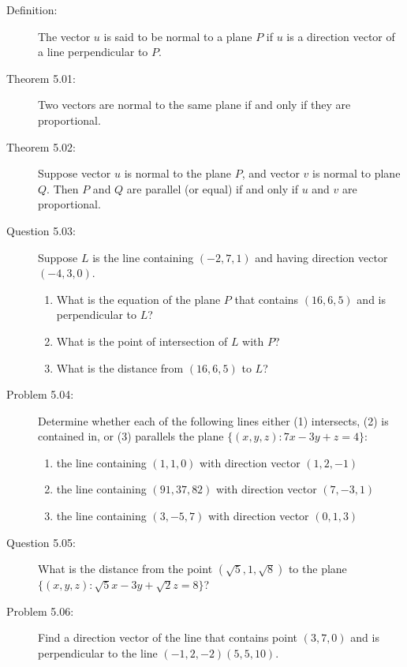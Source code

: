 \documentclass{article}
\begin{document}
\begin{description}

  \item[Definition:] The vector $u$ is said to be normal to a plane $P$ if $u$ is a direction vector of a line perpendicular to $P$.

  \item[Theorem 5.01:] Two vectors are normal to the same plane if and only if they are proportional.

  \item[Theorem 5.02:] Suppose vector $u$ is normal to the plane $P$, and vector $v$ is normal to plane $Q$. Then $P$ and $Q$ are parallel (or equal) if and only if $u$ and $v$ are proportional.

  \item[Question 5.03:] Suppose $L$ is the line containing $(-2, 7, 1)$ and having direction vector $(-4, 3, 0)$.
    \begin{enumerate}[\hspace{1cm}(a)]
      \item What is the equation of the plane $P$ that contains $(16, 6, 5)$ and is perpendicular to $L$?
      \item What is the point of intersection of $L$ with $P$?
      \item What is the distance from $(16, 6, 5)$ to $L$?
    \end{enumerate}

  \item[Problem 5.04:] Determine whether each of the following lines either (1) intersects, (2) is contained in, or (3) parallels the plane $\{ (x,y,z): 7x-3y+z = 4 \}$:
    \begin{enumerate}[\hspace{1cm}(a)]
      \item the line containing $(1, 1, 0)$ with direction vector $(1, 2, -1)$
      \item the line containing $(91, 37, 82)$ with direction vector $(7, -3, 1)$
      \item the line containing $(3, -5, 7)$ with direction vector $(0, 1, 3)$
    \end{enumerate}

  \item[Question 5.05:] What is the distance from the point $(\sqrt{5}, 1, \sqrt{8})$ to the plane $\{ (x,y,z): \sqrt{5}x-3y + \sqrt{2}z = 8 \}$?

  \item[Problem 5.06:] Find a direction vector of the line that contains point $(3, 7, 0)$ and is perpendicular to the line $(-1, 2, -2) (5, 5, 10)$.


\end{description}
\end{document}
